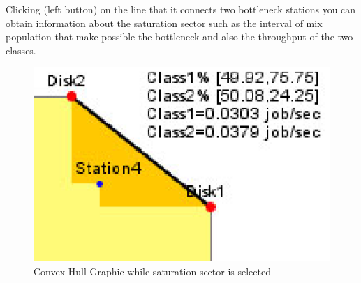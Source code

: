 Clicking (left button) on the line that it connects two bottleneck stations you can obtain information about the saturation sector  such as the interval of mix population that make possible the bottleneck and also the throughput of the two classes.
\begin{figure}[htbp]
    \begin{center}
        \includegraphics[scale=.8]{img/jaba/convexHullSaturationSector}
    \end{center}
    \caption{Convex Hull Graphic while saturation sector is selected}
    \label{fig:jaba:convexHullSaturationSector}
\end{figure}

